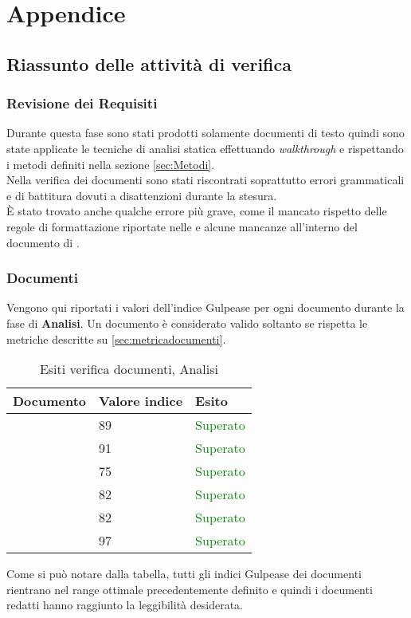 \appendix
\section{Appendice}
\subsection{Riassunto delle attività di verifica}{
\subsubsection{Revisione dei Requisiti}{

Durante questa fase sono stati prodotti solamente documenti di testo quindi sono state applicate le tecniche di analisi statica effettuando \textit{walkthrough} e rispettando i metodi definiti nella sezione \ref{sec:Metodi}.\\
Nella verifica dei documenti sono stati riscontrati soprattutto errori grammaticali e di battitura dovuti a disattenzioni durante la stesura.\\
È stato trovato anche qualche errore più grave, come il mancato rispetto delle regole di formattazione riportate nelle \NormeDiProgetto e alcune mancanze all'interno del documento di \AnalisiDeiRequisiti.\\
}
\subsubsection{Documenti}{
Vengono qui riportati i valori dell’indice Gulpease per ogni documento durante la fase di \textbf{Analisi}. Un documento è considerato valido soltanto se rispetta le metriche descritte su \ref{sec:metricadocumenti}.

\begin{table}[H]
	\centering
	\begin{tabular}{p{}p{}
			p{}}
		\toprule Documento & Valore indice & Esito \\
		\midrule
		\PianoDiProgetto & 89 & \textcolor{green}{Superato} \\
		\AnalisiDeiRequisiti & 91 & \textcolor{green}{Superato} \\
		\NormeDiProgetto & 75 & \textcolor{green}{Superato} \\
		\PianoDiQualifica & 82 & \textcolor{green}{Superato} \\
		\StudioDiFattibilita & 82 & \textcolor{green}{Superato} \\
		\Glossario & 97 & \textcolor{green}{Superato} \\
		\bottomrule
	\end{tabular}
	\label{tab:costorequisiti}
	\caption{Esiti verifica documenti, Analisi}
\end{table}

Come si può notare dalla tabella, tutti gli indici Gulpease dei documenti rientrano nel range ottimale precedentemente definito e quindi i documenti redatti hanno raggiunto la leggibilità desiderata.
}
}
